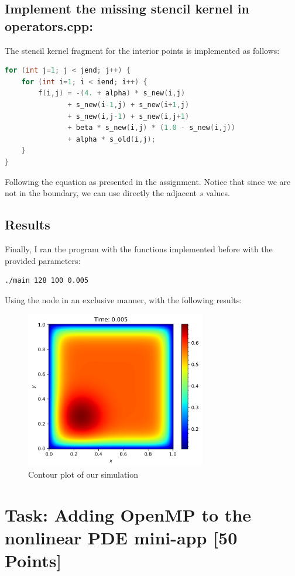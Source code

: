 \documentclass[unicode,11pt,a4paper,oneside,numbers=endperiod,openany]{scrartcl}
\begin{document}
\subsection{Implement the missing stencil kernel in operators.cpp:}
The stencil kernel fragment for the interior points is implemented as follows:
\begin{lstlisting}[language=C]
  for (int j=1; j < jend; j++) {
    for (int i=1; i < iend; i++) {
        f(i,j) = -(4. + alpha) * s_new(i,j)
               + s_new(i-1,j) + s_new(i+1,j)
               + s_new(i,j-1) + s_new(i,j+1)
               + beta * s_new(i,j) * (1.0 - s_new(i,j))
               + alpha * s_old(i,j);
    }
}
\end{lstlisting}
Following the equation as presented in the assignment. Notice that since we are not 
in the boundary, we can use directly the adjacent $s$ values. 

\subsection{Results}
Finally, I ran the program with the functions implemented before with the provided parameters: 
\begin{lstlisting}[language=bash]
  ./main 128 100 0.005
\end{lstlisting}
Using the node in an exclusive manner, with the following results: 

\begin{figure}[H]
  \centering
  \includegraphics[width=0.7\textwidth]{./img/exe1/output.png}
  \caption{Contour plot of our simulation}
\end{figure}

\section{Task:  Adding OpenMP to the nonlinear PDE mini-app [50 Points]}
\end{document}
